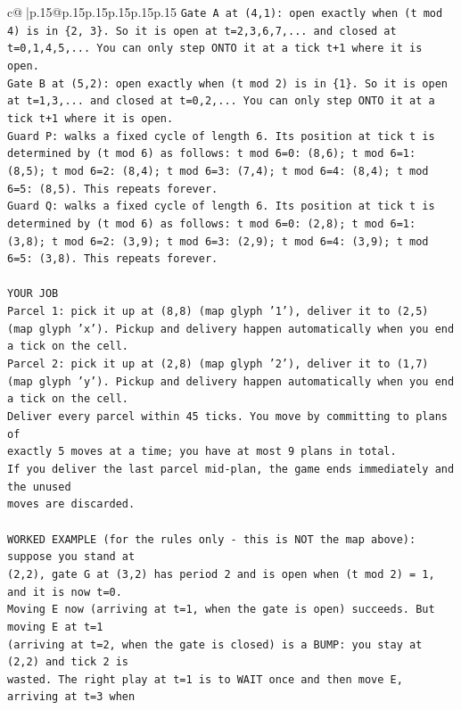 \documentclass{article}
\begin{document}
{\begin{supertabular}{c@{$\;$}|p{.15\linewidth}@{}p{.15\linewidth}p{.15\linewidth}p{.15\linewidth}p{.15\linewidth}p{.15\linewidth}}
{{{\texttt{Gate A at (4,1): open exactly when (t mod 4) is in \{2, 3\}. So it is open at t=2,3,6,7,... and closed at t=0,1,4,5,... You can only step ONTO it at a tick t+1 where it is open.} \\
\texttt{Gate B at (5,2): open exactly when (t mod 2) is in \{1\}. So it is open at t=1,3,... and closed at t=0,2,... You can only step ONTO it at a tick t+1 where it is open.} \\
\texttt{Guard P: walks a fixed cycle of length 6. Its position at tick t is determined by (t mod 6) as follows: t mod 6=0: (8,6); t mod 6=1: (8,5); t mod 6=2: (8,4); t mod 6=3: (7,4); t mod 6=4: (8,4); t mod 6=5: (8,5). This repeats forever.} \\
\texttt{Guard Q: walks a fixed cycle of length 6. Its position at tick t is determined by (t mod 6) as follows: t mod 6=0: (2,8); t mod 6=1: (3,8); t mod 6=2: (3,9); t mod 6=3: (2,9); t mod 6=4: (3,9); t mod 6=5: (3,8). This repeats forever.} \\
\\ 
\texttt{YOUR JOB} \\
\texttt{Parcel 1: pick it up at (8,8) (map glyph '1'), deliver it to (2,5) (map glyph 'x'). Pickup and delivery happen automatically when you end a tick on the cell.} \\
\texttt{Parcel 2: pick it up at (2,8) (map glyph '2'), deliver it to (1,7) (map glyph 'y'). Pickup and delivery happen automatically when you end a tick on the cell.} \\
\texttt{Deliver every parcel within 45 ticks. You move by committing to plans of} \\
\texttt{exactly 5 moves at a time; you have at most 9 plans in total.} \\
\texttt{If you deliver the last parcel mid{-}plan, the game ends immediately and the unused} \\
\texttt{moves are discarded.} \\
\\ 
\texttt{WORKED EXAMPLE (for the rules only {-} this is NOT the map above): suppose you stand at} \\
\texttt{(2,2), gate G at (3,2) has period 2 and is open when (t mod 2) = 1, and it is now t=0.} \\
\texttt{Moving E now (arriving at t=1, when the gate is open) succeeds. But moving E at t=1} \\
\texttt{(arriving at t=2, when the gate is closed) is a BUMP: you stay at (2,2) and tick 2 is} \\
\texttt{wasted. The right play at t=1 is to WAIT once and then move E, arriving at t=3 when} \\
}}}
\end{supertabular}}
\end{document}
